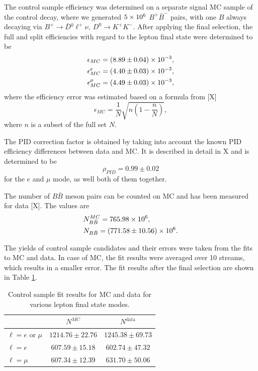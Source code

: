 The control sample efficiency was determined on a separate signal MC sample of the control decay, where we generated $5\times 10^{6}$ $B^+ \bar B^-$ pairs, with one $B$ always decaying via $B^+ \to \bar D {}^0 \ell^+ \nu,~D^0 \to K^+K^-$. After applying the final selection, the full and split efficiencies with regard to the lepton final state were determined to be 
\begin{align*}
\epsilon_{MC} &= (8.89\pm 0.04)\times 10^{-3},\\
\epsilon_{MC}^e &= (4.40\pm 0.03)\times 10^{-3},\\
\epsilon_{MC}^\mu &= (4.49\pm 0.03)\times 10^{-3},
\end{align*}
where the efficiency error was estimated based on a formula from [X]
\begin{equation*}
\epsilon_{MC} = \frac{1}{N}\sqrt{n(1-\frac{n}{N})},
\end{equation*}
where $n$ is a subset of the full set $N$.

The PID correction factor is obtained by taking into account the known PID efficiency differences between data and MC. It is described in detail in X and is determined to be
\begin{equation*}
\rho_{PID} = 0.99\pm 0.02
\end{equation*}
for the $e$ and $\mu$ mode, as well both of them together.

The number of $B\bar B$ meson pairs can be counted on MC and has been measured for data [X]. The values are
\begin{align*}
&N_{B\bar B}^{MC} = 765.98\times 10^{6},\\
&N_{B\bar B} = (771.58 \pm 10.56)\times 10^{6}.
\end{align*}

The yields of control sample candidates and their errors were taken from the fits to MC and data. In case of MC, the fit results were averaged over 10 streams, which results in a smaller error. The fit results after the final selection are shown in Table \ref{tab:fit_yield}.

\begin{table}[H]
	\centering
	\begin{tabular}{|l|c|c|}
\hline
 & $N^{MC}$ & $N^{\mathrm{data}}$ \\
\hline
$\ell = e$ or $\mu$ & $1214.76 \pm 22.76$ & $1245.38 \pm 69.73$\\
	\hline
$\ell = e$ & $607.59 \pm 15.18$ & $602.74 \pm 47.32$ \\
\hline
$\ell = \mu$ & $607.34 \pm 12.39$ & $631.70 \pm 50.06$\\
	\hline
\end{tabular}
\caption{Control sample fit results for MC and data for various lepton final state modes.}
\label{tab:fit_yield}
\end{table}

